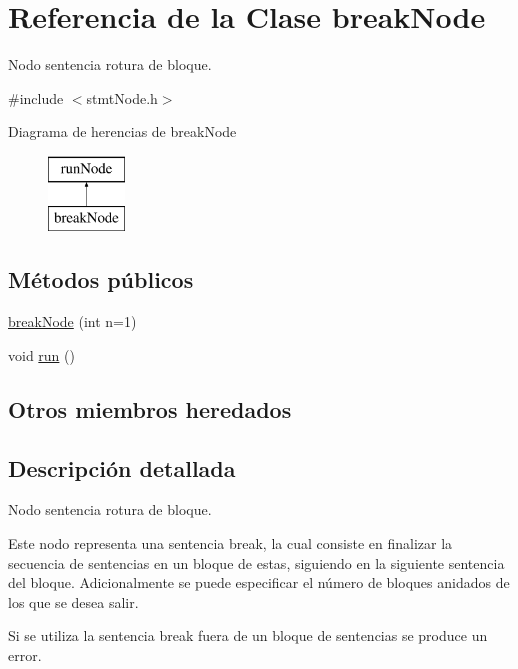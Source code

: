 \hypertarget{classbreakNode}{\section{Referencia de la Clase break\-Node}
\label{classbreakNode}
}


Nodo sentencia rotura de bloque.  




{\ttfamily \#include $<$stmt\-Node.\-h$>$}

Diagrama de herencias de break\-Node\begin{figure}[H]
\begin{center}
\leavevmode
\includegraphics[height=2.000000cm]{classbreakNode}
\end{center}
\end{figure}
\subsection*{Métodos públicos}
\begin{DoxyCompactItemize}
\item 
\hyperlink{classbreakNode_a59baec750674d27ecd07a6361deaa77d}{break\-Node} (int n=1)
\item 
void \hyperlink{classbreakNode_a3fb64fa2dbc0a81922690ad041a40467}{run} ()
\end{DoxyCompactItemize}
\subsection*{Otros miembros heredados}


\subsection{Descripción detallada}
Nodo sentencia rotura de bloque. 

Este nodo representa una sentencia break, la cual consiste en finalizar la secuencia de sentencias en un bloque de estas, siguiendo en la siguiente sentencia del bloque. Adicionalmente se puede especificar el número de bloques anidados de los que se desea salir.

Si se utiliza la sentencia break fuera de un bloque de sentencias se produce un error. 


